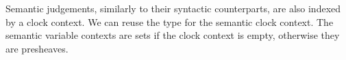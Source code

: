
Semantic judgements, similarly to their syntactic counterparts, are also indexed by
a clock context. We can reuse the type  for the semantic
clock context.
The semantic variable contexts are sets if the clock context is empty,
otherwise they are presheaves.
\begin{code}%
\>[0]\AgdaSpace{}%
\AgdaSymbol{:}\AgdaSpace{}%
\AgdaSpace{}%
\AgdaSpace{}%
\<%
\\
\>[0]\AgdaSpace{}%
\AgdaSpace{}%
\AgdaSymbol{=}\AgdaSpace{}%
\<%
\\
\>[0]\AgdaSpace{}%
\AgdaSpace{}%
\AgdaSymbol{=}\AgdaSpace{}%
\<%
\end{code}
